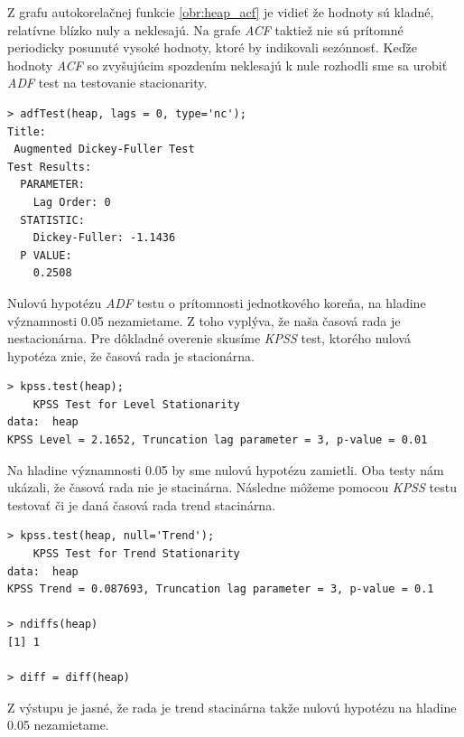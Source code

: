 \documentclass[12pt,a4paper,oneside,final]{article}
\theoremstyle{definition}
\theoremstyle{remark}
\numberwithin{equation}{section}
\begin{document}
Z grafu autokorelačnej funkcie \ref{obr:heap_acf} je vidieť že hodnoty sú kladné,
relatívne blízko nuly a neklesajú. 
Na grafe \emph{ACF} taktiež nie sú prítomné periodicky posunuté vysoké hodnoty, 
ktoré by indikovali sezónnosť.
Keďže hodnoty \emph{ACF} so zvyšujúcim spozdením neklesajú k nule rozhodli sme sa urobiť
\emph{ADF} test na testovanie stacionarity.

\begin{minipage}{\linewidth}
\begingroup
\fontsize{9pt}{7pt}\selectfont  %
\begin{verbatim}
> adfTest(heap, lags = 0, type='nc');
Title:
 Augmented Dickey-Fuller Test
Test Results:
  PARAMETER:
    Lag Order: 0
  STATISTIC:
    Dickey-Fuller: -1.1436
  P VALUE:
    0.2508 
\end{verbatim}
\endgroup
\end{minipage}

Nulovú hypotézu \emph{ADF} testu o prítomnosti jednotkového koreňa, na hladine významnosti 0.05
nezamietame. Z toho vyplýva, že naša časová rada je nestacionárna. Pre dôkladné 
overenie skusíme \emph{KPSS} test, ktorého nulová hypotéza znie, že časová rada je stacionárna.

\begin{minipage}{\linewidth}
\begingroup
\fontsize{9pt}{7pt}\selectfont %
\begin{verbatim}
> kpss.test(heap);
	KPSS Test for Level Stationarity
data:  heap
KPSS Level = 2.1652, Truncation lag parameter = 3, p-value = 0.01
\end{verbatim}
\endgroup
\end{minipage}

Na hladine významnosti 0.05 by sme nulovú hypotézu zamietli. Oba testy nám ukázali, že časová
rada nie je stacinárna. 
Následne môžeme pomocou \emph{KPSS} testu testovať či je daná časová rada trend stacinárna.

\begin{minipage}{\linewidth}
\begingroup
\fontsize{9pt}{7pt}\selectfont %
\begin{verbatim}
> kpss.test(heap, null='Trend');
	KPSS Test for Trend Stationarity
data:  heap
KPSS Trend = 0.087693, Truncation lag parameter = 3, p-value = 0.1

> ndiffs(heap)
[1] 1

> diff = diff(heap)
\end{verbatim}
\endgroup
\end{minipage}

Z výstupu je jasné, že rada je trend stacinárna takže nulovú hypotézu na hladine 0.05
nezamietame.
\end{document}
